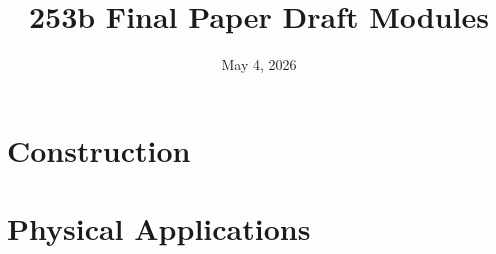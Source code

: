 \documentclass[11pt]{article}
\title{253b Final Paper Draft Modules}
\author{}
\date{May 4, 2026}
\theoremstyle{definition}
\theoremstyle{plain}
\begin{document}
\maketitle
\tableofcontents
\newpage

\part{Construction}






\part{Physical Applications}










\appendix





\end{document}
